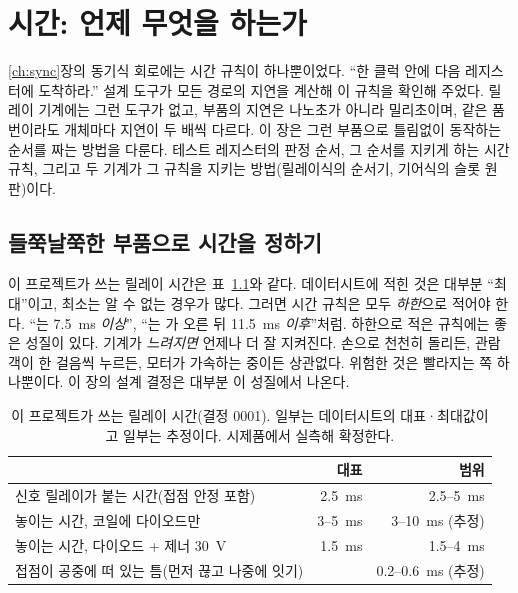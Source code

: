 \chapter{시간: 언제 무엇을 하는가}\label{ch:relay-timing}

\ref{ch:sync}장의 동기식 회로에는 시간 규칙이 하나뿐이었다. ``한 클럭 안에 다음 레지스터에 도착하라.''
설계 도구가 모든 경로의 지연을 계산해 이 규칙을 확인해 주었다. 릴레이 기계에는 그런 도구가 없고, 부품의
지연은 나노초가 아니라 밀리초이며, 같은 품번이라도 개체마다 지연이 두 배씩 다르다. 이 장은 그런 부품으로
틀림없이 동작하는 순서를 짜는 방법을 다룬다. 테스트 레지스터의 판정 순서, 그 순서를 지키게 하는 시간
규칙, 그리고 두 기계가 그 규칙을 지키는 방법(릴레이식의 순서기, 기어식의 슬롯 원판)이다.

\section{들쭉날쭉한 부품으로 시간을 정하기}\label{sec:t-bounds}

\Why 이 프로젝트가 쓰는 릴레이 시간은 표~\ref{tab:t-relay}와 같다. 데이터시트에 적힌 것은 대부분 ``최대''이고,
최소는 알 수 없는 경우가 많다. 그러면 시간 규칙은 모두 \emph{하한}으로 적어야 한다. ``는 7.5~ms
\emph{이상}'', ``는 가 오른 뒤 11.5~ms \emph{이후}''처럼. 하한으로 적은 규칙에는 좋은
성질이 있다. 기계가 \emph{느려지면} 언제나 더 잘 지켜진다. 손으로 천천히 돌리든, 관람객이 한 걸음씩
누르든, 모터가 가속하는 중이든 상관없다. 위험한 것은 빨라지는 쪽 하나뿐이다. 이 장의 설계 결정은 대부분 이
성질에서 나온다.

\begin{table}[ht]
\centering
\caption{이 프로젝트가 쓰는 릴레이 시간(결정 0001). 일부는 데이터시트의 대표·최대값이고 일부는 추정이다.
시제품에서 실측해 확정한다.}
\label{tab:t-relay}
\small
\begin{tabular}{lrr}
\toprule
& 대표 & 범위 \\
\midrule
신호 릴레이가 붙는 시간(접점 안정 포함) & 2.5~ms & 2.5--5~ms \\
놓이는 시간, 코일에 다이오드만 & 3--5~ms & 3--10~ms (추정) \\
놓이는 시간, 다이오드 + 제너 30~V & 1.5~ms & 1.5--4~ms \\
접점이 공중에 떠 있는 틈(먼저 끊고 나중에 잇기) & & 0.2--0.6~ms (추정) \\
\bottomrule
\end{tabular}
\end{table}

